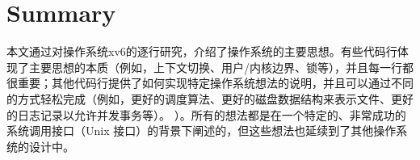 

   \chapter{Summary}   
    \label{CH:SUM}     

本文通过对操作系统xv6的逐行研究，介绍了操作系统的主要思想。有些代码行体现了主要思想的本质（例如，上下文切换、用户/内核边界、锁等），并且每一行都很重要；其他代码行提供了如何实现特定操作系统想法的说明，并且可以通过不同的方式轻松完成（例如，更好的调度算法、更好的磁盘数据结构来表示文件、更好的日志记录以允许并发事务等）。 ）。所有的想法都是在一个特定的、非常成功的系统调用接口（Unix 接口）的背景下阐述的，但这些想法也延续到了其他操作系统的设计中。  



